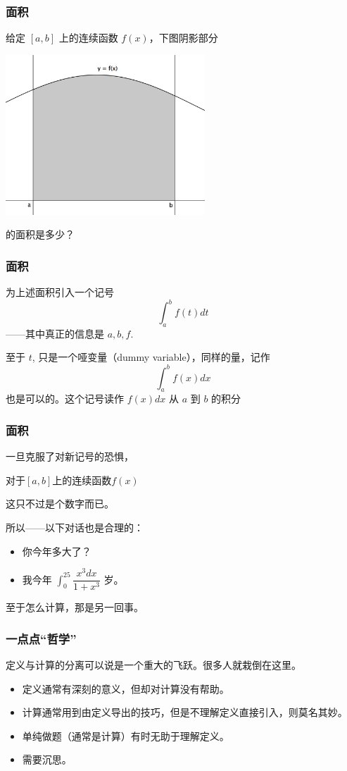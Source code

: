 \documentclass[CJK]{beamer}
\begin{document}
\begin{frame}
\frametitle{面积}
给定 $[a,b]$ 上的连续函数 $f(x)$，下图阴影部分
\begin{center}
\includegraphics[height=6cm]{graph6.jpeg}
\end{center}
的面积是多少？
\end{frame}

\begin{frame}
\frametitle{面积}
为上述面积引入一个\alert{记号}
\[
	\int_a^b f(t)dt
\]
——其中真正的\alert{信息}是 $a, b, f$.

\vspace{1em}

至于 $t$, 只是一个\alert{哑变量}（dummy variable），同样的量，记作
\[
	\int_a^b f(x)dx
\]
也是可以的。这个记号读作 $f(x)dx$ 从 $a$ 到 $b$ 的\alert{积分}
\end{frame}

\begin{frame}
\frametitle{面积}

一旦克服了对新记号的\alert{恐惧}，

对于$[a,b]$上的连续函数$f(x)$

这只不过是个\alert{数字}而已。

所以——以下对话也是合理的：

\begin{itemize}
	\item 你今年多大了？
	\item 我今年 $ \displaystyle\int_0^{25}\dfrac{x^3dx}{1+x^3} $ 岁。
\end{itemize}

至于怎么计算，那是\alert{另一回事}。

\end{frame}


\begin{frame}
\frametitle{一点点``哲学''}

\alert{定义与计算的分离}可以说是一个重大的飞跃。很多人就栽倒在这里。

\begin{itemize}
	\setlength\itemsep{0.5em}
	\item 定义通常\alert{有深刻的意义}，但却对计算\alert{没有帮助}。
	\item 计算通常用到\alert{由定义导出的技巧}，但是不理解定义直接引入，则\alert{莫名其妙}。
	\item 单纯\alert{做题}（通常是计算）有时无助于理解定义。
	\item 需要\alert{沉思}。
\end{itemize}

\end{frame}
\end{document}
